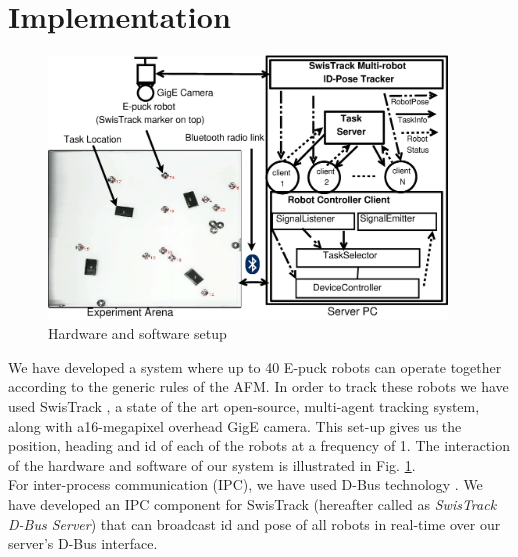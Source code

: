 \documentclass{llncs}
\begin{document}
\section{Implementation}
\label{sec:impl}
\begin{figure}
\centering
\includegraphics[height=7cm, angle=0]
{../dia-files/RIL-Expt-Setup1.eps}
\caption{\small Hardware and software setup}
\label{fig:setup} %
\end{figure}
We have developed a system where up to 40 E-puck robots \cite{Epuck} can operate together according to the generic rules of the AFM. In order to track these robots we have used SwisTrack \cite{SwisTrack}, a state of the art open-source, multi-agent tracking system, along with a16-megapixel overhead GigE camera. This set-up gives us the position, heading and id of each of the robots at a frequency of 1. The interaction of the hardware and software of our system is illustrated in Fig. \ref{fig:setup}. \\
For inter-process communication (IPC), we have used D-Bus technology \cite{DBus}. We have developed an IPC component for SwisTrack (hereafter called as \textit{SwisTrack D-Bus Server}) that can broadcast id and pose of all robots in real-time over our server's D-Bus interface.\\
\end{document}
